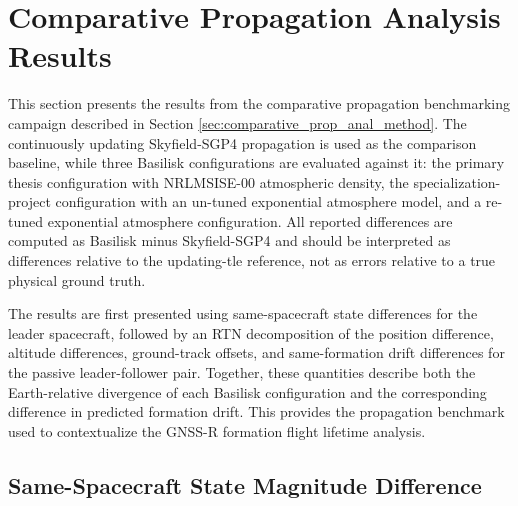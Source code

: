 
\section{Comparative Propagation Analysis Results}
This section presents the results from the comparative propagation benchmarking campaign described in Section \ref{sec:comparative_prop_anal_method}. The continuously updating Skyfield-SGP4 propagation is used as the comparison baseline, while three Basilisk configurations are evaluated against it: the primary thesis configuration with NRLMSISE-00 atmospheric density, the specialization-project configuration with an un-tuned exponential atmosphere model, and a re-tuned exponential atmosphere configuration. All reported differences are computed as Basilisk minus Skyfield-SGP4 and should be interpreted as differences relative to the updating-\gls{tle} reference, not as errors relative to a true physical ground truth.

The results are first presented using same-spacecraft state differences for the leader spacecraft, followed by an RTN decomposition of the position difference, altitude differences, ground-track offsets, and same-formation drift differences for the passive leader-follower pair. Together, these quantities describe both the Earth-relative divergence of each Basilisk configuration and the corresponding difference in predicted formation drift. This provides the propagation benchmark used to contextualize the GNSS-R formation flight lifetime analysis.

\subsection{Same-Spacecraft State Magnitude Difference}

